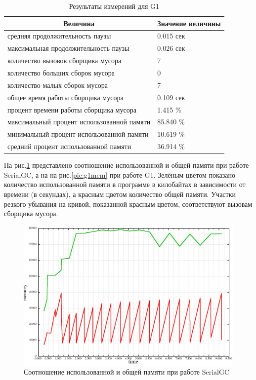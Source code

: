 \begin{table}[h!]
\caption {\label{table:g1}Результаты измерений для G1}
\begin{center}
\begin{tabular}{|l|l|}
\hline
\multicolumn{1}{|c|}{Величина} & Значение величины\\
\hline
средняя продолжительность паузы & 0.015 сек\\
\hline
максимальная продолжительность паузы & 0.026 сек\\
\hline
количество вызовов сборщика мусора & 7\\
\hline
количество больших сборок мусора & 0 \\
\hline
количество малых сборок мусора & 7 \\
\hline
общее время работы сборщика мусора & 0.109 сек\\
\hline
процент времени работы сборщика мусора & 1.415 \%\\
\hline
максимальный процент использованной памяти & 85.840 \%\\
\hline
минимальный процент использованной памяти & 10.619 \%\\
\hline
средний процент использованной памяти & 36.914 \%\\
\hline
\end{tabular}
\end{center}
\end{table}

На рис.\ref{pic:serialmem} представлено соотношение использованной и общей памяти
при работе SerialGC, а на на рис.\ref{pic:g1mem} при работе G1. Зелёным цветом показано
количество использованной памяти в программе в килобайтах в зависимости от времени (в секундах),
а красным цветом количество общей памяти. Участки резкого убывания на кривой, показанной красным цветом,
соответствуют вызовам сборщика мусора.

\begin{figure}
\caption{\label{pic:serialmem}Соотношение использованной и общей памяти при работе SerialGC}
\includegraphics[width=1\linewidth]{Bakradze/serialmem.jpg}
\end{figure}


